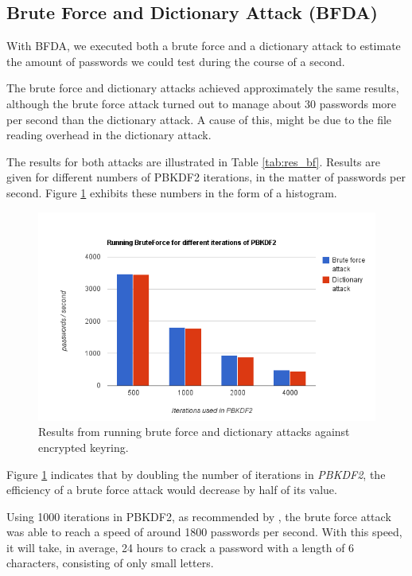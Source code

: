 \documentclass[pdftex,english,10pt,b5paper,twoside]{book}
\begin{document}
\subsection{Brute Force and Dictionary Attack (BFDA)}

With \ac{BFDA}, we executed both a brute force and a dictionary attack to
estimate the amount of passwords we could test during the course of a second.

The brute force and dictionary attacks achieved approximately the same results,
although the brute force attack turned out to manage about 30 passwords more
per second than the dictionary attack. A cause of this, might be due to the
file reading overhead in the dictionary attack. 

The results for both attacks are illustrated in Table \ref{tab:res_bf}. Results
are given for different numbers of \ac{PBKDF2} iterations, in the matter of
passwords per second. Figure \ref{fig:bfres} exhibits these numbers in the form
of a histogram.



\begin{figure}[!h]
\centering
\includegraphics[scale=0.55]{bf.png}
\caption{Results from running brute force and dictionary attacks against encrypted keyring.}
\label{fig:bfres}
\end{figure}

Figure \ref{fig:bfres} indicates that by doubling the number of iterations in
\emph{PBKDF2}, the efficiency of a brute force attack would decrease by half of
its value.

Using 1000 iterations in \ac{PBKDF2}, as recommended by \citet{pbkdf2std}, the
brute force attack was able to reach a speed of around 1800 passwords per
second. With this speed, it will take, in average, 24 hours to crack a password
with a length of 6 characters, consisting of only small letters.
\end{document}
